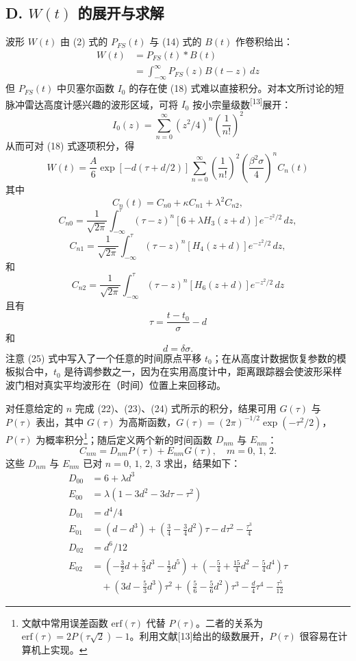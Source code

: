 \subsection*{D. $W(t)$ 的展开与求解}

波形 $W(t)$ 由 (2) 式的 $P_{FS}(t)$ 与 (14) 式的 $B(t)$ 作卷积给出：
\[
\begin{aligned}
W(t) &= P_{FS}(t)*B(t) \\
&= \int_{-\infty}^{\infty} P_{FS}(z)B(t-z)\,dz
\end{aligned}
\tag{18}
\]
但 $P_{FS}(t)$ 中贝塞尔函数 $I_{0}$ 的存在使 (18) 式难以直接积分。对本文所讨论的短脉冲雷达高度计感兴趣的波形区域，可将 $I_{0}$ 按小宗量级数\textsuperscript{[13]}展开：
\[
I_{0}(z) = \sum_{n=0}^{\infty}\left(z^{2}/4\right)^{n}\left(\frac{1}{n!}\right)^{2}
\tag{19}
\]
从而可对 (18) 式逐项积分，得
\[
W(t) = \frac{A}{6}\exp\left[-d(\tau + d/2)\right]\sum_{n=0}^{\infty}\left(\frac{1}{n!}\right)^{2}\left(\frac{\beta^{2}\sigma}{4}\right)^{n} C_{n}(t)
\tag{20}
\]
其中
\[
C_{n}(t) = C_{n0} + \kappa C_{n1} + \lambda^{2}C_{n2},
\tag{21}
\]
\[
C_{n0} = \frac{1}{\sqrt{2\pi}}\int_{-\infty}^{\tau}\left(\tau - z\right)^{n}\left[6 + \lambda H_{3}(z+d)\right]e^{-z^{2}/2}\,dz,
\tag{22}
\]
\[
C_{n1} = \frac{1}{\sqrt{2\pi}}\int_{-\infty}^{\tau}\left(\tau - z\right)^{n}\left[H_{4}(z+d)\right]e^{-z^{2}/2}\,dz,
\tag{23}
\]
和
\[
C_{n2} = \frac{1}{\sqrt{2\pi}}\int_{-\infty}^{\tau}\left(\tau - z\right)^{n}\left[H_{6}(z+d)\right]e^{-z^{2}/2}\,dz
\tag{24}
\]
且有
\[
\tau = \frac{t - t_{0}}{\sigma} - d
\tag{25}
\]
和
\[
d = \delta\sigma.
\tag{26}
\]
注意 (25) 式中写入了一个任意的时间原点平移 $t_{0}$；在从高度计数据恢复参数的模板拟合中，$t_{0}$ 是待调参数之一，因为在实用高度计中，距离跟踪器会使波形采样波门相对真实平均波形在（时间）位置上来回移动。

对任意给定的 $n$ 完成 (22)、(23)、(24) 式所示的积分，结果可用 $G(\tau)$ 与 $P(\tau)$ 表出，其中 $G(\tau)$ 为高斯函数，$G(\tau) = (2\pi)^{-1/2}\exp(-\tau^{2}/2)$，$P(\tau)$ 为概率积分\footnote{文献中常用误差函数 $\mathrm{erf}(\tau)$ 代替 $P(\tau)$。二者的关系为 $\mathrm{erf}(\tau) = 2P(\tau\sqrt{2}) - 1$。利用文献[13]给出的级数展开，$P(\tau)$ 很容易在计算机上实现。}；随后定义两个新的时间函数 $D_{nm}$ 与 $E_{nm}$：
\[
C_{nm} = D_{nm}P(\tau) + E_{nm}G(\tau),\quad m = 0,\,1,\,2.
\tag{27}
\]
这些 $D_{nm}$ 与 $E_{nm}$ 已对 $n = 0,\,1,\,2,\,3$ 求出，结果如下：
\[
\begin{aligned}
D_{00} &= 6 + \lambda d^{3} \\
E_{00} &= \lambda\left(1 - 3d^{2} - 3d\tau - \tau^{2}\right) \\
D_{01} &= d^{4}/4 \\
E_{01} &= \left(d - d^{3}\right) + \left(\tfrac{3}{4} - \tfrac{3}{4}d^{2}\right)\tau - d\tau^{2} - \frac{\tau^{3}}{4} \\
D_{02} &= d^{6}/12 \\
E_{02} &= \left(-\tfrac{3}{2}d + \tfrac{5}{3}d^{3} - \tfrac{1}{2}d^{5}\right) + \left(-\tfrac{5}{4} + \tfrac{15}{4}d^{2} - \tfrac{5}{4}d^{4}\right)\tau \\
&\quad + \left(3d - \tfrac{5}{3}d^{3}\right)\tau^{2} + \left(\tfrac{5}{6} - \tfrac{5}{6}d^{2}\right)\tau^{3} - \frac{d}{4}\tau^{4} - \frac{\tau^{5}}{12}
\end{aligned}
\tag{28}
\]

